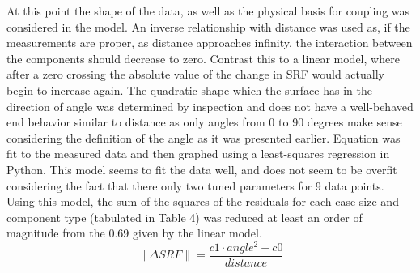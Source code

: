 \documentclass[12pt]{usfcoe}
\begin{document}
    At this point the shape of the data, as well as the physical basis for coupling was considered in the model. 
    An inverse relationship with distance was used as, if the measurements are proper, as distance approaches infinity, the interaction between the components should decrease to zero.
    Contrast this to a linear model, where after a zero crossing the absolute value of the change in SRF would actually begin to increase again. 
    The quadratic shape which the surface has in the direction of angle was determined by inspection and does not have a well-behaved end behavior similar to distance as only angles from 0 to 90 degrees make sense considering the definition of the angle as it was presented earlier.
    Equation \label{eq:individual_model} was fit to the measured data and then graphed using a least-squares regression in Python. 
    This model seems to fit the data well, and does not seem to be overfit considering the fact that there only two tuned parameters for 9 data points. 
    Using this model, the sum of the squares of the residuals for each case size and component type (tabulated in Table 4) was reduced at least an order of magnitude from the 0.69 given by the linear model.
    \begin{equation}\label{eq:individual_model}
    \|\Delta SRF\| = \frac{c1 \cdot angle^2+ c0}{distance}
    \end{equation}
    
\end{document}
